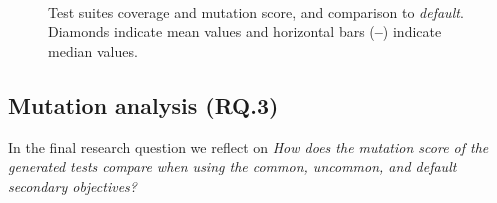 \begin{figure}[t]
    \centering
    \hfill
    \\ 
   
    \caption{Test suites coverage and mutation score, and comparison to \textit{default}. Diamonds indicate mean values and horizontal bars (\textbf{--}) indicate median values.}
    \label{fig:rq2}
\end{figure}

\subsection{Mutation analysis (RQ.3)}

In the final research question we reflect on \emph{How does the \emph{mutation score} of the generated tests  compare when using the \textit{common}, \textit{uncommon}, and \textit{default} secondary objectives? }

